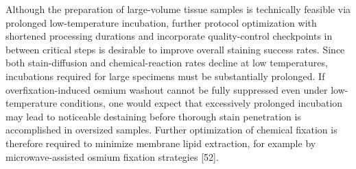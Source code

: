\documentclass{article}
\begin{document}
\noindent Although the preparation of large-volume tissue samples is technically feasible via prolonged low-temperature incubation, further protocol optimization with shortened processing durations and incorporate quality-control checkpoints in between critical steps is desirable to improve overall staining success rates. Since both stain-diffusion and chemical-reaction rates decline at low temperatures, incubations required for large specimens must be substantially prolonged. If overfixation-induced osmium washout cannot be fully suppressed even under low-temperature conditions, one would expect that excessively prolonged incubation may lead to noticeable destaining before thorough stain penetration is accomplished in oversized samples. Further optimization of chemical fixation is therefore required to minimize membrane lipid extraction, for example by microwave-assisted osmium fixation strategies [52].
\end{document}
